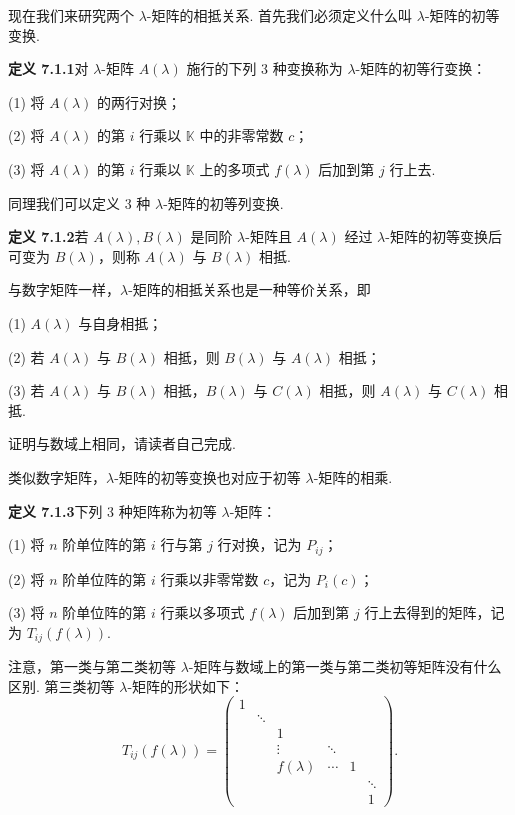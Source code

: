 \documentclass[UTF8, 12pt, fontset=fandol, oneside]{ctexart}
\begin{document}
现在我们来研究两个 $\lambda$-矩阵的相抵关系. 首先我们必须定义什么叫 $\lambda$-矩阵的初等变换.

\noindent\textbf{定义 7.1.1}\quad 对 $\lambda$-矩阵 $A(\lambda)$ 施行的下列 3 种变换称为 $\lambda$-矩阵的初等行变换：

(1) 将 $A(\lambda)$ 的两行对换；

(2) 将 $A(\lambda)$ 的第 $i$ 行乘以 $\mathbb{K}$ 中的非零常数 $c$；

(3) 将 $A(\lambda)$ 的第 $i$ 行乘以 $\mathbb{K}$ 上的多项式 $f(\lambda)$ 后加到第 $j$ 行上去.

同理我们可以定义 3 种 $\lambda$-矩阵的初等列变换.

\noindent\textbf{定义 7.1.2}\quad 若 $A(\lambda),B(\lambda)$ 是同阶 $\lambda$-矩阵且 $A(\lambda)$ 经过 $\lambda$-矩阵的初等变换后可变为 $B(\lambda)$，则称 $A(\lambda)$ 与 $B(\lambda)$ 相抵.

与数字矩阵一样，$\lambda$-矩阵的相抵关系也是一种等价关系，即

(1) $A(\lambda)$ 与自身相抵；

(2) 若 $A(\lambda)$ 与 $B(\lambda)$ 相抵，则 $B(\lambda)$ 与 $A(\lambda)$ 相抵；

(3) 若 $A(\lambda)$ 与 $B(\lambda)$ 相抵，$B(\lambda)$ 与 $C(\lambda)$ 相抵，则 $A(\lambda)$ 与 $C(\lambda)$ 相抵.

证明与数域上相同，请读者自己完成.

类似数字矩阵，$\lambda$-矩阵的初等变换也对应于初等 $\lambda$-矩阵的相乘.

\noindent\textbf{定义 7.1.3}\quad 下列 3 种矩阵称为初等 $\lambda$-矩阵：

(1) 将 $n$ 阶单位阵的第 $i$ 行与第 $j$ 行对换，记为 $P_{ij}$；

(2) 将 $n$ 阶单位阵的第 $i$ 行乘以非零常数 $c$，记为 $P_i(c)$；

(3) 将 $n$ 阶单位阵的第 $i$ 行乘以多项式 $f(\lambda)$ 后加到第 $j$ 行上去得到的矩阵，记为 $T_{ij}(f(\lambda))$.

注意，第一类与第二类初等 $\lambda$-矩阵与数域上的第一类与第二类初等矩阵没有什么区别. 第三类初等 $\lambda$-矩阵的形状如下：
\[
T_{ij}(f(\lambda))=
\left(\begin{array}{cccccc}
1 & & & & & \\
& \ddots & & & & \\
& & 1 & & & \\
& & \vdots & \ddots & & \\
& & f(\lambda) & \cdots & 1 & \\
& & & & & \ddots\\
& & & & & 1
\end{array}\right).
\]
\end{document}
